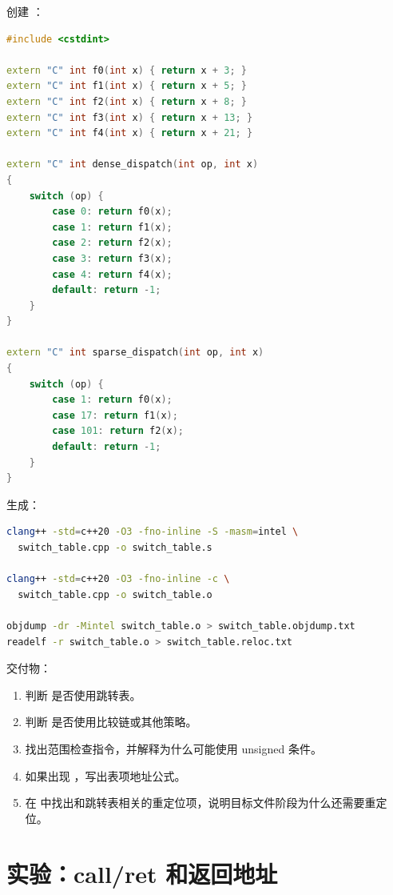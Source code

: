 \begin{labbox}
创建 ：

\begin{lstlisting}[language=C++]
#include <cstdint>

extern "C" int f0(int x) { return x + 3; }
extern "C" int f1(int x) { return x + 5; }
extern "C" int f2(int x) { return x + 8; }
extern "C" int f3(int x) { return x + 13; }
extern "C" int f4(int x) { return x + 21; }

extern "C" int dense_dispatch(int op, int x)
{
    switch (op) {
        case 0: return f0(x);
        case 1: return f1(x);
        case 2: return f2(x);
        case 3: return f3(x);
        case 4: return f4(x);
        default: return -1;
    }
}

extern "C" int sparse_dispatch(int op, int x)
{
    switch (op) {
        case 1: return f0(x);
        case 17: return f1(x);
        case 101: return f2(x);
        default: return -1;
    }
}
\end{lstlisting}

生成：

\begin{lstlisting}[language=bash]
clang++ -std=c++20 -O3 -fno-inline -S -masm=intel \
  switch_table.cpp -o switch_table.s

clang++ -std=c++20 -O3 -fno-inline -c \
  switch_table.cpp -o switch_table.o

objdump -dr -Mintel switch_table.o > switch_table.objdump.txt
readelf -r switch_table.o > switch_table.reloc.txt
\end{lstlisting}

交付物：

\begin{enumerate}
  \item 判断  是否使用跳转表。
  \item 判断  是否使用比较链或其他策略。
  \item 找出范围检查指令，并解释为什么可能使用 unsigned 条件。
  \item 如果出现 ，写出表项地址公式。
  \item 在 \code{readelf -r} 中找出和跳转表相关的重定位项，说明目标文件阶段为什么还需要重定位。
\end{enumerate}
\end{labbox}

\section{实验：call/ret 和返回地址}

